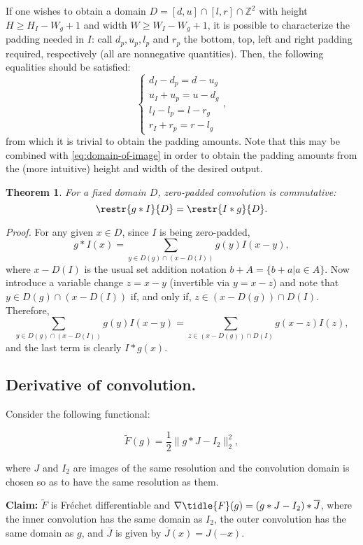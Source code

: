 \documentclass{article}
\newtheorem{theorem}{Theorem}
\begin{document}
If one wishes to obtain a domain \(D=[d, u]\cap[l, r]\cap \mathbb{Z}^2\) with height \(H \geq H_I - W_g + 1\) and width \(W \geq W_I - W_g + 1\), it is possible to characterize the padding needed in \(I\): call \(d_p, u_p, l_p\) and \(r_p\) the bottom, top, left and right padding required, respectively (all are nonnegative quantities). Then, the following equalities should be satisfied:
\[
\left\{
\begin{align}
  d_I - d_p = d - u_g\\
  u_I + u_p = u - d_g\\
  l_I - l_p = l - r_g\\
  r_I + r_p = r - l_g
\end{align}
\right.
,\]
from which it is trivial to obtain the padding amounts. Note that this may be combined with \cref{eq:domain-of-image} in order to obtain the padding amounts from the (more intuitive) height and width of the desired output.

\begin{theorem}
  For a fixed domain \(D\), zero-padded convolution is commutative:
  \[
    \restr{g\ast I}{D} = \restr{I\ast g}{D}
  .\]
\end{theorem}
\textit{Proof.} For any given \(x\in D\), since \(I\) is being zero-padded,
\[
  g\ast I(x) = \sum_{y\in D(g)\cap\left(x - D(I)\right)}g(y)I(x-y),
\]
where \(x-D(I)\) is the usual set addition notation \(b+A = \{b + a | a\in A\}\). Now introduce a variable change \(z = x-y\) (invertible via \(y=x-z\)) and note that \(y\in D(g)\cap (x-D(I))\) if, and only if, \(z\in(x-D(g))\cap D(I)\). Therefore,
\[
  \sum_{y\in D(g)\cap\left(x - D(I)\right)}g(y)I(x-y) = \sum_{z\in (x-D(g))\cap D(I)}g(x-z)I(z)
,\]
and the last term is clearly \(I\ast g(x)\).~\qedsymbol

\subsection{Derivative of convolution.}

Consider the following functional:

\[
  \tilde{F}(g) = \frac12\|g\ast J - I_2\|_2^2
,\]

where \(J\) and \(I_2\) are images of the same resolution and the convolution domain is chosen so as to have the same resolution as them.

\textbf{Claim:} \(\tilde{F}\) is Fréchet differentiable and \(\nabla{\tidle{F}}(g) = \left(g\ast J - I_2\right)\ast \overline{J}\), where the inner convolution has the same domain as \(I_2\), the outer convolution has the same domain as \(g\), and \(\overline{J}\) is given by \(\overline{J}(x)=J(-x)\).
\end{document}
